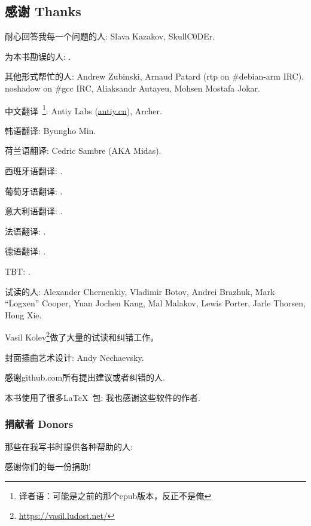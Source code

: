 \documentclass[UTF8,nofonts]{ctexart}
\begin{document}

\subsection*{感谢 Thanks}

耐心回答我每一个问题的人: Slava  Kazakov, SkullC0DEr.

为本书勘误的人: \PeopleMistakesInaccuracies{}.

其他形式帮忙的人:
Andrew Zubinski,
Arnaud Patard (rtp on \#debian-arm IRC),
noshadow on \#gcc IRC,
Aliaksandr Autayeu,
Mohsen Mostafa Jokar.

中文翻译~\footnote{译者语：可能是之前的那个epub版本，反正不是俺}:
Antiy Labs (\href{http://antiy.cn}{antiy.cn}), Archer.

韩语翻译: Byungho Min.

荷兰语翻译: Cedric Sambre (AKA Midas).

西班牙语翻译: \PeopleSpanishTranslators{}.

葡萄牙语翻译: \PeoplePTBRTranslators{}.

意大利语翻译: \PeopleItalianTranslators{}.

法语翻译: \PeopleFrenchTranslators{}.

德语翻译: \PeopleGermanTranslators{}.

\ac{TBT}: \PeoplePolishTranslators{}.


试读的人:
Alexander  Chernenkiy,
Vladimir Botov,
Andrei Brazhuk,
Mark ``Logxen'' Cooper, Yuan Jochen Kang, Mal Malakov, Lewis Porter, Jarle Thorsen, Hong Xie.

Vasil Kolev\footnote{\url{https://vasil.ludost.net/}}做了大量的试读和纠错工作。

封面插曲艺术设计: Andy Nechaevsky.

感谢github.com所有提出建议或者纠错的人\FNGithubContributors{}.

本书使用了很多\LaTeX\ 包: 我也感谢这些软件的作者.

\subsubsection*{捐献者 Donors}

那些在我写书时提供各种帮助的人:



感谢你们的每一份捐助!
\end{document}
